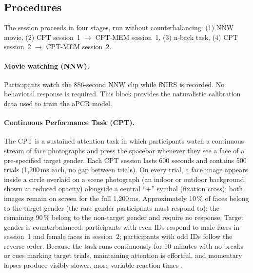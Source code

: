 \subsection{Procedures}

The session proceeds in four stages, run without counterbalancing: (1) NNW movie, (2) CPT session~1 $\to$ CPT-MEM session~1, (3) n-back task, (4) CPT session~2 $\to$ CPT-MEM session~2.

\paragraph{Movie watching (NNW).} Participants watch the 886-second NNW clip while fNIRS is recorded. No behavioral response is required. This block provides the naturalistic calibration data used to train the aPCR model.

\paragraph{Continuous Performance Task (CPT).} The CPT is a sustained attention task in which participants watch a continuous stream of face photographs and press the spacebar whenever they see a face of a pre-specified target gender. Each CPT session lasts 600 seconds and contains 500 trials (1,200\,ms each, no gap between trials). On every trial, a face image appears inside a circle overlaid on a scene photograph (an indoor or outdoor background, shown at reduced opacity) alongside a central ``+'' symbol (fixation cross); both images remain on screen for the full 1,200\,ms. Approximately 10\,\% of faces belong to the target gender (the rare gender participants must respond to); the remaining 90\,\% belong to the non-target gender and require no response. Target gender is counterbalanced: participants with even IDs respond to male faces in session~1 and female faces in session~2; participants with odd IDs follow the reverse order. Because the task runs continuously for 10 minutes with no breaks or cues marking target trials, maintaining attention is effortful, and momentary lapses produce visibly slower, more variable reaction times \citep{kofler2013}.

